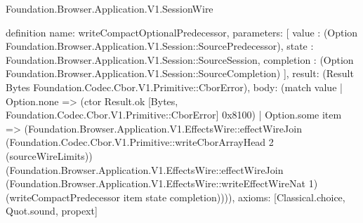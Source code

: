 \begin{lexlean}{Foundation.Browser.Application.V1.SessionWire}
\begin{semanticmodule}
definition{
  name: writeCompactOptionalPredecessor,
  parameters: [
    value : (Option Foundation.Browser.Application.V1.Session::SourcePredecessor),
    state : Foundation.Browser.Application.V1.Session::SourceSession,
    completion : (Option Foundation.Browser.Application.V1.Session::SourceCompletion)
  ],
  result: (Result Bytes Foundation.Codec.Cbor.V1.Primitive::CborError),
  body: (match value
    | Option.none => (ctor Result.ok [Bytes, Foundation.Codec.Cbor.V1.Primitive::CborError] 0x8100)
    | Option.some item => (Foundation.Browser.Application.V1.EffectsWire::effectWireJoin (Foundation.Codec.Cbor.V1.Primitive::writeCborArrayHead 2 (sourceWireLimits)) (Foundation.Browser.Application.V1.EffectsWire::effectWireJoin (Foundation.Browser.Application.V1.EffectsWire::writeEffectWireNat 1) (writeCompactPredecessor item state completion)))),
  axioms: [Classical.choice, Quot.sound, propext]
}


\end{semanticmodule}
\end{lexlean}
